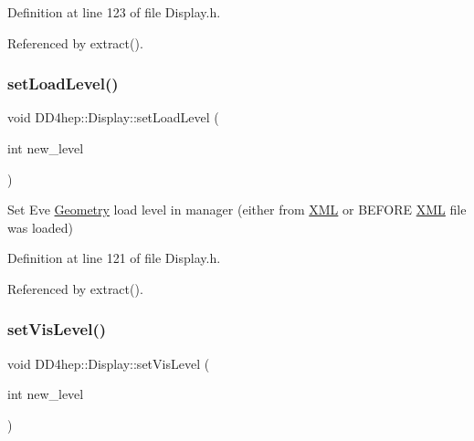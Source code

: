 Definition at line 123 of file Display.\+h.



Referenced by extract().

\hypertarget{class_d_d4hep_1_1_display_a40be77ac29040ee1847af97871b78259}{}\label{class_d_d4hep_1_1_display_a40be77ac29040ee1847af97871b78259} 
\subsubsection{\texorpdfstring{set\+Load\+Level()}{setLoadLevel()}}
{\footnotesize\ttfamily void D\+D4hep\+::\+Display\+::set\+Load\+Level (\begin{DoxyParamCaption}\item[{int}]{new\+\_\+level }\end{DoxyParamCaption})\hspace{0.3cm}{\ttfamily [inline]}}



Set Eve \hyperlink{namespace_d_d4hep_1_1_geometry}{Geometry} load level in manager (either from \hyperlink{namespace_d_d4hep_1_1_x_m_l}{X\+ML} or B\+E\+F\+O\+RE \hyperlink{namespace_d_d4hep_1_1_x_m_l}{X\+ML} file was loaded) 



Definition at line 121 of file Display.\+h.



Referenced by extract().

\hypertarget{class_d_d4hep_1_1_display_a57cf9b4b15b4627ac264bc95583ace91}{}\label{class_d_d4hep_1_1_display_a57cf9b4b15b4627ac264bc95583ace91} 
\subsubsection{\texorpdfstring{set\+Vis\+Level()}{setVisLevel()}}
{\footnotesize\ttfamily void D\+D4hep\+::\+Display\+::set\+Vis\+Level (\begin{DoxyParamCaption}\item[{int}]{new\+\_\+level }\end{DoxyParamCaption})\hspace{0.3cm}{\ttfamily [inline]}}



